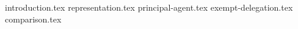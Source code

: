 {introduction.tex}
{representation.tex}
{principal-agent.tex}
{exempt-delegation.tex}
{comparison.tex}
